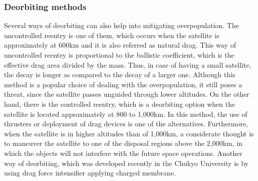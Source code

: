 \bigskip
\subsubsection{Deorbiting methods}
Several ways of deorbiting can also help into mitigating overpopulation. The uncontrolled reentry is one of them, which occurs when the satellite is approximately at 600km and it is also referred as natural drag. This way of uncontrolled reentry is proportional to the ballistic coefficient, which is the effective drag area divided by the mass. Thus, in case of having a small satellite, the decay is longer as compared to the decay of a larger one. Although this method is a popular choice of dealing with the overpopulation, it still poses a threat, since the satellite passes unguided through lower altitudes. On the other hand, there is the controlled reentry, which is a deorbiting option when the satellite is located approximately at 800 to 1,000km. In this method, the use of thrusters or deployment of drag devices is one of the alternatives. Furthermore, when the satellite is in higher altitudes than of 1,000km, a considerate thought is to maneuver the satellite to one of the disposal regions above the 2,000km, in which the objects will not interfere with the future space operations. \cite{NASA} Another way of deorbiting, which was developed recently in the Chukyo University is by using drag force intensifier applying charged membrane. \cite{muranaka}


\bigskip

